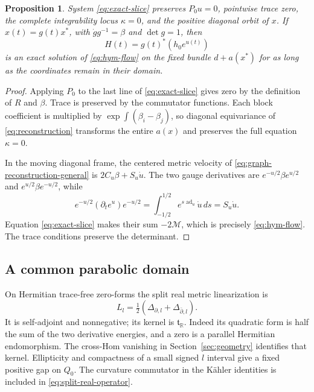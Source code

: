 \documentclass[11pt]{amsart}
\newtheorem{proposition}[theorem]{Proposition}
\theoremstyle{definition}
\theoremstyle{remark}
\newcommand{\RR}{\mathbb R}
\newcommand{\ad}{\operatorname{ad}}
\begin{document}
\begin{proposition}\label{prop:exact-reconstruction}
System \eqref{eq:exact-slice} preserves $P_0u=0$, pointwise trace
zero, the complete integrability locus $\kappa=0$, and the positive
diagonal orbit of $x$. If $x(t)=g(t)x^*$, with
$\dot g g^{-1}=\beta$ and $\det g=1$, then
\begin{equation}\label{eq:graph-reconstruction-general}
 H(t)=g(t)^*(h_0e^{u(t)})
\end{equation}
is an exact solution of \eqref{eq:hym-flow} on the fixed bundle
$d+a(x^*)$ for as long as the coordinates remain in their domain.
\end{proposition}
\begin{proof}
Applying $P_0$ to the last line of \eqref{eq:exact-slice} gives
zero by the definition of $R$ and $\beta$. Trace is preserved by
the commutator functions. Each block coefficient is multiplied by
$\exp\int(\beta_i-\beta_j)$, so diagonal equivariance of
\eqref{eq:reconstruction} transforms the entire $a(x)$ and preserves
the full equation $\kappa=0$.

In the moving diagonal frame, the centered metric velocity of
\eqref{eq:graph-reconstruction-general} is
$2C_u\beta+S_u\dot u$. The two gauge derivatives are
$e^{-u/2}\beta e^{u/2}$ and $e^{u/2}\beta e^{-u/2}$, while
\[
 e^{-u/2}(\partial_te^u)e^{-u/2}
   =\int_{-1/2}^{1/2}e^{s\ad_u}\dot u\,ds=S_u\dot u.
\]
Equation \eqref{eq:exact-slice} makes their sum $-2\mathcal M$,
which is precisely \eqref{eq:hym-flow}. The trace conditions
preserve the determinant.
\end{proof}

\subsection{A common parabolic domain}
On Hermitian trace-free zero-forms the split real metric linearization is
\begin{equation}\label{eq:split-real-operator}
 L_l=\tfrac12(\Delta_{\partial,l}+\Delta_{\bar\partial,l}).
\end{equation}
It is self-adjoint and nonnegative; its kernel is
$\mathfrak t_{\RR}$. Indeed its quadratic form is half the sum of
the two derivative energies, and a zero is a parallel Hermitian
endomorphism. The cross-Hom vanishing in Section~\ref{sec:geometry}
identifies that kernel. Ellipticity and compactness of a small signed
$l$ interval give a fixed positive gap on $Q_0$.
The curvature commutator in the K\"ahler identities is included
in \eqref{eq:split-real-operator}.
\end{document}
